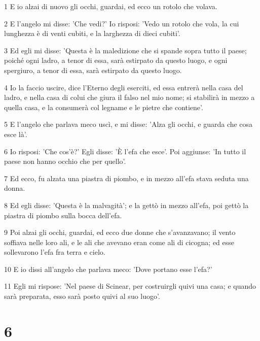 \par 1 E io alzai di nuovo gli occhi, guardai, ed ecco un rotolo che volava.
\par 2 E l'angelo mi disse: 'Che vedi?' Io risposi: 'Vedo un rotolo che vola, la cui lunghezza è di venti cubiti, e la larghezza di dieci cubiti'.
\par 3 Ed egli mi disse: 'Questa è la maledizione che si spande sopra tutto il paese; poiché ogni ladro, a tenor di essa, sarà estirpato da questo luogo, e ogni spergiuro, a tenor di essa, sarà estirpato da questo luogo.
\par 4 Io la faccio uscire, dice l'Eterno degli eserciti, ed essa entrerà nella casa del ladro, e nella casa di colui che giura il falso nel mio nome; si stabilirà in mezzo a quella casa, e la consumerà col legname e le pietre che contiene'.
\par 5 E l'angelo che parlava meco uscì, e mi disse: 'Alza gli occhi, e guarda che cosa esce là'.
\par 6 Io risposi: 'Che cos'è?' Egli disse: 'È l'efa che esce'. Poi aggiunse: 'In tutto il paese non hanno occhio che per quello'.
\par 7 Ed ecco, fu alzata una piastra di piombo, e in mezzo all'efa stava seduta una donna.
\par 8 Ed egli disse: 'Questa è la malvagità'; e la gettò in mezzo all'efa, poi gettò la piastra di piombo sulla bocca dell'efa.
\par 9 Poi alzai gli occhi, guardai, ed ecco due donne che s'avanzavano; il vento soffiava nelle loro ali, e le ali che avevano eran come ali di cicogna; ed esse sollevarono l'efa fra terra e cielo.
\par 10 E io dissi all'angelo che parlava meco: 'Dove portano esse l'efa?'
\par 11 Egli mi rispose: 'Nel paese di Scinear, per costruirgli quivi una casa; e quando sarà preparata, esso sarà posto quivi al suo luogo'.

\chapter{6}

